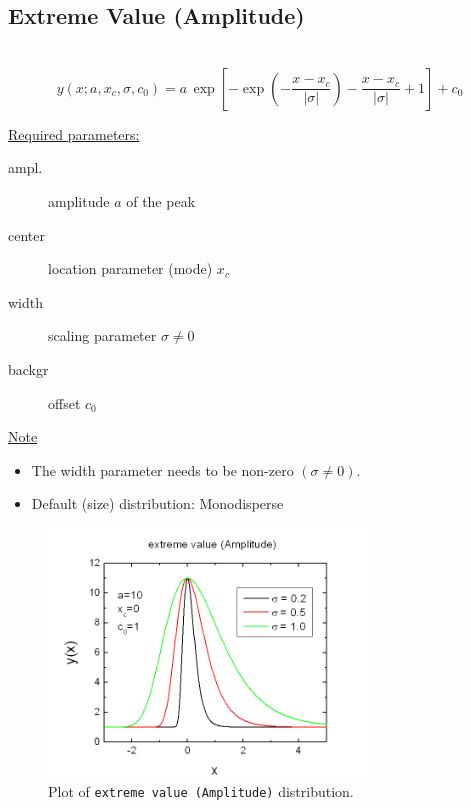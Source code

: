 \subsection{Extreme Value (Amplitude)} \hspace{1pt} \\
\label{sec:ExtremeValueAmplitude}
\begin{equation}
y(x;a,x_c,\sigma,c_0) = a \,
\exp\left[-\exp\left(-\frac{x-x_c}{|\sigma|}\right)-\frac{x-x_c}{|\sigma|}+1\right]
+c_0
\end{equation}
\vspace{5mm}

\underline{Required parameters:}
\begin{description}
    \item[ampl.] amplitude $a$ of the peak
    \item[center] location parameter (mode) $x_c$
    \item[width] scaling parameter $\sigma\neq 0$
    \item[backgr] offset $c_0$
\end{description}

\underline{Note}
\begin{itemize}
  \item The width parameter needs to be non-zero $(\sigma\neq 0)$.
  \item Default (size) distribution: Monodisperse
\end{itemize}
\begin{figure}[htb]
\begin{center}
\includegraphics[width=0.768\textwidth]{ExtremeValueAmplitude.png}
\end{center}
\caption{Plot of \texttt{extreme value (Amplitude)} distribution.}
\label{fig:ExtremeValueAmplitude}
\end{figure}

